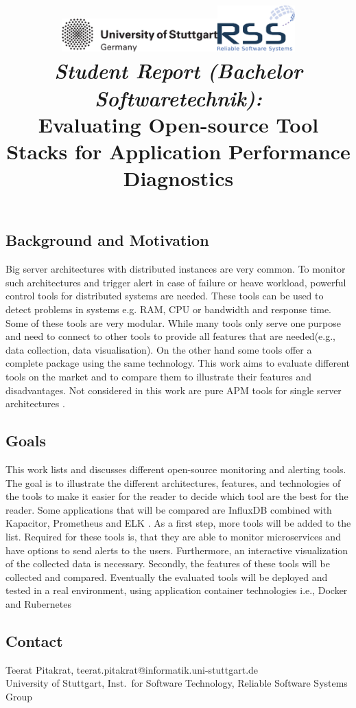 \documentclass[a4paper,12pt]{article}
\date{}
\title{
\includegraphics[width=6cm]{figures/stuttgart-vector.pdf}\hfill{\includegraphics[width=3cm]{figures/rss_logo.pdf}}
\quad \\ [0.5cm]
{\large \textit{Student Report (Bachelor Softwaretechnik):}} \\ [1mm]
{\Large Evaluating Open-source Tool Stacks for Application Performance Diagnostics}
}
\begin{document}
	

\maketitle

\thispagestyle{empty}

\vspace{-2.5cm}


\subsection*{Background and Motivation}
Big server architectures with distributed instances are very common. To monitor such architectures and trigger alert in case of failure or heave workload, powerful control tools for distributed systems are needed. These tools can be used to detect problems in systems e.g. RAM, CPU or bandwidth and response time. Some of these tools are very modular. While many tools only serve one purpose and need to connect to other tools to provide all features that are needed(e.g., data collection, data visualisation). On the other hand some tools offer a complete package using the same technology.
This work aims to evaluate different tools on the market and to compare them to illustrate their features and disadvantages. 
Not considered in this work are pure APM tools for single server architectures \cite{ahmed2016studying} \cite{Heger2017} .

\subsection*{Goals}
This work lists and discusses different open-source monitoring and alerting tools. The goal is to illustrate the different architectures, features, and technologies of the tools to make it easier for the reader to decide which tool are the best for the reader.
Some applications that will be compared are InfluxDB \cite{InfluxDB} combined with Kapacitor, Prometheus \cite{Prometheus}  and ELK \cite{ELK} . As a first step, more tools will be added to the list. Required for these tools is, that they are able to monitor microservices and have options to send alerts to the users. Furthermore, an interactive visualization of the collected data is necessary.
Secondly, the features of these tools will be collected and compared. Eventually the evaluated tools will be deployed and tested in a real environment, using application container technologies i.e., Docker and Rubernetes 


\begin{scriptsize}


\end{scriptsize}

\subsection*{Contact}
Teerat Pitakrat, teerat.pitakrat@informatik.uni-stuttgart.de \\
University of Stuttgart, Inst.\ for Software Technology, Reliable Software Systems Group \\
\end{document}
